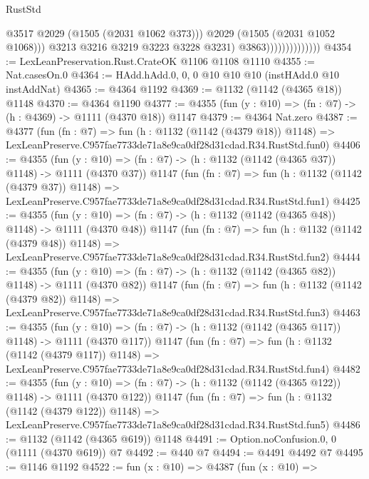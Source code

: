 \begin{lexlean}{RustStd}
\begin{coremodule}
                                      @3517
                                      @2029
                                      (@1505 (@2031 @1062 @373)))
                                    @2029
                                    (@1505 (@2031 @1052 @1068)))
                                  @3213
                                  @3216
                                  @3219
                                  @3223
                                  @3228
                                  @3231)
                                @3863))))))))))))))
@4354 := LexLeanPreservation.Rust.CrateOK @1106 @1108 @1110
@4355 := Nat.casesOn.{0}
@4364 := HAdd.hAdd.{0, 0, 0} @10 @10 @10 (instHAdd.{0} @10 instAddNat)
@4365 := @4364 @1192
@4369 := @1132 (@1142 (@4365 @18)) @1148
@4370 := @4364 @1190
@4377 := @4355 (fun (y : @10) => (fn : @7) -> (h : @4369) -> @1111 (@4370 @18)) @1147
@4379 := @4364 Nat.zero
@4387 := @4377
    (fun (fn : @7) =>
    fun (h : @1132 (@1142 (@4379 @18)) @1148) =>
    LexLeanPreserve.C957fae7733de71a8e9ca0df28d31cdad.R34.RustStd.fun0)
@4406 := @4355
    (fun (y : @10) => (fn : @7) -> (h : @1132 (@1142 (@4365 @37)) @1148) -> @1111 (@4370 @37))
    @1147
    (fun (fn : @7) =>
    fun (h : @1132 (@1142 (@4379 @37)) @1148) =>
    LexLeanPreserve.C957fae7733de71a8e9ca0df28d31cdad.R34.RustStd.fun1)
@4425 := @4355
    (fun (y : @10) => (fn : @7) -> (h : @1132 (@1142 (@4365 @48)) @1148) -> @1111 (@4370 @48))
    @1147
    (fun (fn : @7) =>
    fun (h : @1132 (@1142 (@4379 @48)) @1148) =>
    LexLeanPreserve.C957fae7733de71a8e9ca0df28d31cdad.R34.RustStd.fun2)
@4444 := @4355
    (fun (y : @10) => (fn : @7) -> (h : @1132 (@1142 (@4365 @82)) @1148) -> @1111 (@4370 @82))
    @1147
    (fun (fn : @7) =>
    fun (h : @1132 (@1142 (@4379 @82)) @1148) =>
    LexLeanPreserve.C957fae7733de71a8e9ca0df28d31cdad.R34.RustStd.fun3)
@4463 := @4355
    (fun (y : @10) => (fn : @7) -> (h : @1132 (@1142 (@4365 @117)) @1148) -> @1111 (@4370 @117))
    @1147
    (fun (fn : @7) =>
    fun (h : @1132 (@1142 (@4379 @117)) @1148) =>
    LexLeanPreserve.C957fae7733de71a8e9ca0df28d31cdad.R34.RustStd.fun4)
@4482 := @4355
    (fun (y : @10) => (fn : @7) -> (h : @1132 (@1142 (@4365 @122)) @1148) -> @1111 (@4370 @122))
    @1147
    (fun (fn : @7) =>
    fun (h : @1132 (@1142 (@4379 @122)) @1148) =>
    LexLeanPreserve.C957fae7733de71a8e9ca0df28d31cdad.R34.RustStd.fun5)
@4486 := @1132 (@1142 (@4365 @619)) @1148
@4491 := Option.noConfusion.{0, 0} (@1111 (@4370 @619)) @7
@4492 := @440 @7
@4494 := @4491 @4492 @7
@4495 := @1146 @1192
@4522 := fun (x : @10) =>
  @4387
    (fun (x : @10) =>

\end{coremodule}
\end{lexlean}
